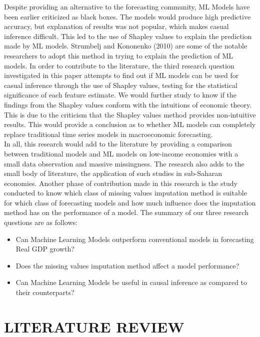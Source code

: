 \documentclass[12pt,italian, twoside]{report}
\begin{document}
Despite providing an alternative to the forecasting community, ML Models have been earlier criticized as black boxes. The models would produce high predictive accuracy, but explanation of results was not popular, which makes casual inference difficult. This led to the use of Shapley values to explain the prediction made by ML models. Strumbelj and Kononenko (2010) are some of the notable researchers to adopt this method in trying to explain the prediction of ML models. In order to contribute to the literature, the third research question investigated in this paper attempts to find out if ML models can be used for casual inference through the use of Shapley values, testing for the statistical significance of each feature estimate. We would further study to know if the findings from the Shapley values conform with the intuitions of economic theory. This is due to the criticism that the Shapley values method provides non-intuitive results.  This would provide a conclusion as to whether ML models can completely replace traditional time series models in macroeconomic forecasting.\\
In all, this research would add to the literature by providing a comparison between traditional models and ML models on low-income economies with a small data observation and massive missingness. The research also adds to the small body of literature, the application of such studies in sub-Saharan economies. Another phase of contribution made in this research is the study conducted to know which class of missing values imputation method is suitable for which class of forecasting models and how much influence does the imputation method has on the performance of a model.
The summary of our three research questions are as follows:
\begin{itemize}
\item Can Machine Learning Models outperform conventional models in forecasting Real GDP growth?
\item Does the missing values imputation method affect a model performance?
\item Can Machine Learning Models be useful in causal inference as compared to their counterparts?
\end{itemize}




% 
% 

\chapter{LITERATURE REVIEW}
\label{cap3}
\end{document}
